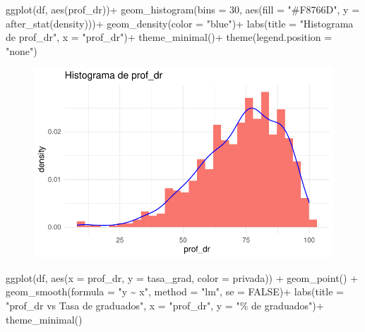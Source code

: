 \documentclass[
  letterpaper,
  DIV=11,
  numbers=noendperiod]{scrartcl}
\newenvironment{Shaded}{\begin{snugshade}}{\end{snugshade}}
\newcommand{\AttributeTok}[1]{\textcolor[rgb]{0.40,0.45,0.13}{#1}}
\newcommand{\ConstantTok}[1]{\textcolor[rgb]{0.56,0.35,0.01}{#1}}
\newcommand{\DecValTok}[1]{\textcolor[rgb]{0.68,0.00,0.00}{#1}}
\newcommand{\FunctionTok}[1]{\textcolor[rgb]{0.28,0.35,0.67}{#1}}
\newcommand{\NormalTok}[1]{\textcolor[rgb]{0.00,0.23,0.31}{#1}}
\newcommand{\SpecialCharTok}[1]{\textcolor[rgb]{0.37,0.37,0.37}{#1}}
\newcommand{\StringTok}[1]{\textcolor[rgb]{0.13,0.47,0.30}{#1}}
\begin{document}
\begin{Shaded}
\begin{Highlighting}[]
\FunctionTok{ggplot}\NormalTok{(df, }\FunctionTok{aes}\NormalTok{(prof\_dr))}\SpecialCharTok{+}
  \FunctionTok{geom\_histogram}\NormalTok{(}\AttributeTok{bins =} \DecValTok{30}\NormalTok{, }\FunctionTok{aes}\NormalTok{(}\AttributeTok{fill =} \StringTok{"\#F8766D"}\NormalTok{, }\AttributeTok{y =} \FunctionTok{after\_stat}\NormalTok{(density)))}\SpecialCharTok{+}
  \FunctionTok{geom\_density}\NormalTok{(}\AttributeTok{color =} \StringTok{"blue"}\NormalTok{)}\SpecialCharTok{+}
  \FunctionTok{labs}\NormalTok{(}\AttributeTok{title =} \StringTok{"Histograma de prof\_dr"}\NormalTok{,}
       \AttributeTok{x =} \StringTok{"prof\_dr"}\NormalTok{)}\SpecialCharTok{+}
  \FunctionTok{theme\_minimal}\NormalTok{()}\SpecialCharTok{+}
  \FunctionTok{theme}\NormalTok{(}\AttributeTok{legend.position =} \StringTok{"none"}\NormalTok{)}
\end{Highlighting}
\end{Shaded}

\begin{figure}[H]

{\centering \includegraphics{TP_final_files/figure-pdf/unnamed-chunk-17-1.pdf}

}

\end{figure}

\begin{Shaded}
\begin{Highlighting}[]
\FunctionTok{ggplot}\NormalTok{(df, }\FunctionTok{aes}\NormalTok{(}\AttributeTok{x =}\NormalTok{ prof\_dr, }\AttributeTok{y =}\NormalTok{ tasa\_grad, }\AttributeTok{color =}\NormalTok{ privada)) }\SpecialCharTok{+}
  \FunctionTok{geom\_point}\NormalTok{() }\SpecialCharTok{+} 
  \FunctionTok{geom\_smooth}\NormalTok{(}\AttributeTok{formula =} \StringTok{"y \textasciitilde{} x"}\NormalTok{, }\AttributeTok{method =} \StringTok{"lm"}\NormalTok{, }\AttributeTok{se =} \ConstantTok{FALSE}\NormalTok{)}\SpecialCharTok{+}
  \FunctionTok{labs}\NormalTok{(}\AttributeTok{title =} \StringTok{"prof\_dr vs Tasa de graduados"}\NormalTok{,}
       \AttributeTok{x =} \StringTok{"prof\_dr"}\NormalTok{,}
       \AttributeTok{y =} \StringTok{"\% de graduados"}\NormalTok{)}\SpecialCharTok{+}
  \FunctionTok{theme\_minimal}\NormalTok{()}
\end{Highlighting}
\end{Shaded}
\end{document}

